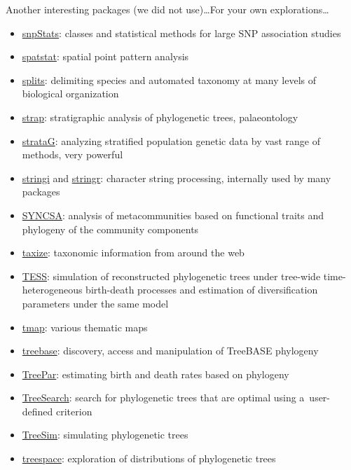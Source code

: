 \documentclass[compress, ucs, xelatex, 11pt, xcolor=svgnames, aspectratio=169,
	hyperref={
		bookmarks=true,
		unicode=true,
		colorlinks=true,
		pdftitle={Molecular data in R},
		plainpages=false,
		pdfauthor={Vojtech Zeisek},
		pdfsubject={Course about phylogeny and evolution in R},
		pdfcreator={XeLaTeX},
		pdfkeywords={R, evolution, phylogeny, molecular data},
		linkcolor=Crimson, %
		anchorcolor=Magenta, %
		citecolor=Magenta, %
		filecolor=Magenta, %
		menucolor=Magenta, %
		urlcolor=DodgerBlue, %
		pdftex},
	url={hyphens, lowtilde} %
	]{beamer}
\begin{document}
\begin{frame}[allowframebreaks]{Another interesting packages (we did not use)\ldots}{For your own explorations\ldots}
\begin{itemize}
		\item \href{https://bioconductor.org/packages/release/bioc/html/snpStats.html}{snpStats}: classes and statistical methods for large SNP association studies
		\item \href{https://CRAN.R-project.org/package=spatstat}{spatstat}: spatial point pattern analysis
		\item \href{https://r-forge.r-project.org/projects/splits/}{splits}: delimiting species and automated taxonomy at many levels of biological organization
		\item \href{https://CRAN.R-project.org/package=strap}{strap}: stratigraphic analysis of phylogenetic trees, palaeontology
		\item \href{https://github.com/cran/strataG}{strataG}: analyzing stratified population genetic data by vast range of methods, very powerful
		\item \href{https://CRAN.R-project.org/package=stringi}{stringi} and \href{https://CRAN.R-project.org/package=stringr}{stringr}: character string processing, internally used by many packages
		\item \href{https://CRAN.R-project.org/package=SYNCSA}{SYNCSA}: analysis of metacommunities based on functional traits and phylogeny of the community components
		\item \href{https://CRAN.R-project.org/package=taxize}{taxize}: taxonomic information from around the web
		\item \href{https://CRAN.R-project.org/package=TESS}{TESS}: simulation of reconstructed phylogenetic trees under tree-wide time-heterogeneous birth-death processes and estimation of diversification parameters under the same model
		\item \href{https://CRAN.R-project.org/package=tmap}{tmap}: various thematic maps
		\item \href{https://CRAN.R-project.org/package=treebase}{treebase}:  discovery, access and manipulation of TreeBASE phylogeny
		\item \href{https://CRAN.R-project.org/package=TreePar}{TreePar}: estimating birth and death rates based on phylogeny
		\item \href{https://CRAN.R-project.org/package=TreeSearch}{TreeSearch}: search for phylogenetic trees that are optimal using a~user-defined criterion
		\item \href{https://CRAN.R-project.org/package=TreeSim}{TreeSim}: simulating phylogenetic trees
		\item \href{https://CRAN.R-project.org/package=treespace}{treespace}: exploration of distributions of phylogenetic trees

\end{itemize}
\end{frame}
\end{document}
